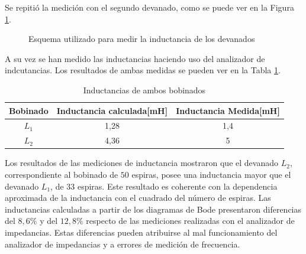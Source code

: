 Se repitió la medición con el segundo devanado, como se puede ver en la Figura \ref{fig:medir_L2}. 

\begin{figure}[H]
    \centering
    \caption{Esquema utilizado para medir la inductancia de los devanados}
    \label{fig:medir_L2}
\end{figure}

A su vez se han medido las inductancias haciendo uso del analizador de indcutancias. Los resultados de ambas medidas se pueden ver en la Tabla \ref{tab:medir_L2}.

\begin{table}[H]
    \centering    
    \begin{tabular}{|c|c|c|}
        \hline
        Bobinado & Inductancia calculada[mH] &Inductancia Medida[mH] \\ 
        \hline
        $L_1$ & 1,28  & 1,4 \\
        \hline
        $L_2$ & 4,36 & 5\\
        \hline
    \end{tabular}
    
    \caption{Inductancias de ambos bobinados}
     \label{tab:medir_L2}
\end{table}

Los resultados de las mediciones de inductancia mostraron que el devanado $L_2$, correspondiente al bobinado de $50$ espiras, posee una inductancia mayor que el devanado $L_1$, de $33$ espiras. Este resultado es coherente con la dependencia aproximada de la inductancia con el cuadrado del número de espiras. Las inductancias calculadas a partir de los diagramas de Bode presentaron diferencias del $8,6\%$ y del $12,8\%$ respecto de las mediciones realizadas con el analizador de impedancias. Estas diferencias pueden atribuirse al mal funcionamiento del analizador de impedancias y a errores de medición de frecuencia. 


